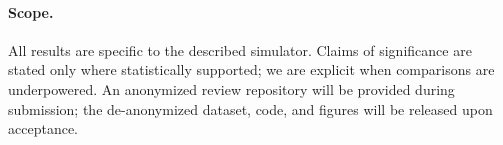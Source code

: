 \paragraph{Scope.}
All results are specific to the described simulator.
Claims of significance are stated only where statistically supported; we are
explicit when comparisons are underpowered.
An anonymized review repository will be provided during submission; the
de-anonymized dataset, code, and figures will be released upon acceptance.

